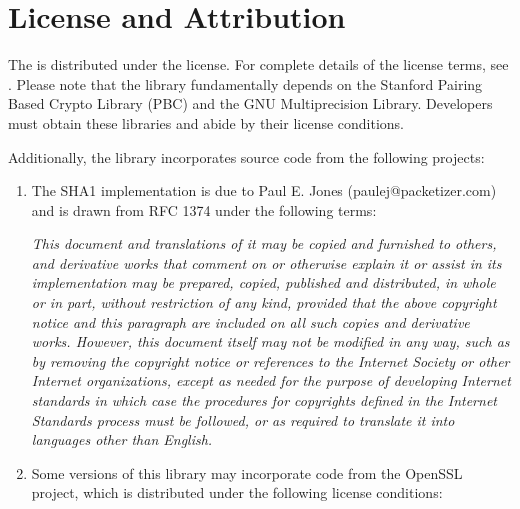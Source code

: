 \chapter{License and Attribution}

The {\libraryname} is distributed under the {\librarylicensename} license.  For complete details of the license terms, see {\librarylicenseurl}.  Please note that the library fundamentally depends on the Stanford Pairing Based Crypto Library (PBC) and the GNU Multiprecision Library.  Developers must obtain these libraries and abide by their license conditions.

\medskip \noindent
Additionally, the library incorporates source code from the following projects:

\begin{enumerate}

\item The SHA1 implementation is due to Paul E. Jones (paulej@packetizer.com) and is drawn from RFC 1374 under the following terms:

{\it
This document and translations of it may be copied and furnished to others, and derivative works that comment on or otherwise explain it or assist in its implementation may be prepared, copied, published and distributed, in whole or in part, without restriction of any kind, provided that the above copyright notice and this paragraph are included on all such copies and derivative works.  However, this document itself may not be modified in any way, such as by removing the copyright notice or references to the Internet Society or other Internet organizations, except as needed for the purpose of developing Internet standards in which case the procedures for copyrights defined in the Internet Standards process must be followed, or as required to translate it into languages other than English.
}

\item Some versions of this library may incorporate code from the OpenSSL project, which is distributed under the following license conditions:


\end{enumerate}
